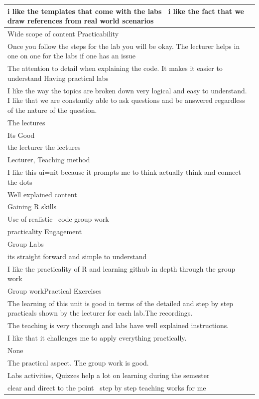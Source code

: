 \documentclass[
]{article}
\begin{document}
\begin{longtable}[t]{>{\raggedright\arraybackslash}p{35em}}
\hline
i like the templates that come with the labs   i like the fact that we draw references from real world scenarios \\
\hline
Wide scope of content  Practicability\\
\hline
Once you follow the steps for the lab you will be okay.  The lecturer helps in one on one for the labs if one has an issue\\
\hline
The attention to detail when explaining the code. It makes it easier to understand  Having practical labs\\
\hline
I like the way the topics are broken down very logical and easy to understand.  I like that we are constantly able to ask questions and be answered regardless of the nature of the question.\\
\hline
The lectures\\
\hline
Its Good\\
\hline
the lecturer  the lectures\\
\hline
Lecturer, Teaching method\\
\hline
I like this ui=nit because it prompts me to think actually think and connect the dots \\
\hline
Well explained content\\
\hline
Gaining R skills\\
\hline
Use of realistic  code  group work\\
\hline
practicality  Engagement\\
\hline
Group Labs\\
\hline
its straight forward and simple to understand \\
\hline
I like the practicality of R and learning github in depth through the group work\\
\hline
Group workPractical Exercises\\
\hline
The learning of this unit is good in terms of the detailed and step by step practicals shown by the lecturer for each lab.The recordings.\\
\hline
The teaching is very thorough and labs have well explained instructions.\\
\hline
I like that it challenges me to apply everything practically.\\
\hline
None\\
\hline
The practical aspect.  The group work is good.\\
\hline
Labs activities, Quizzes help a lot on learning during the semester\\
\hline
clear and direct to the point   step by step teaching works for me\\

\end{longtable}
\end{document}
